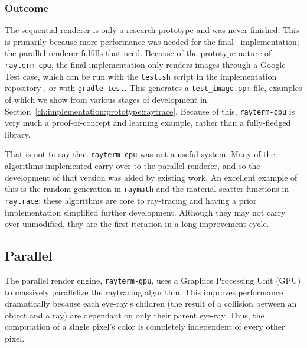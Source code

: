 \subsubsection{Outcome} \label{ch:methods:renderer:sequential:outcome}

The sequential renderer is only a research prototype and was never finished.
This is primarily because more performance was needed for the final \name\ implementation; the parallel renderer fulfills that need.
Because of the prototype nature of \texttt{rayterm-cpu}, the final implementation only renders images through a Google Test \cite{googletest} case, which can be run with the \texttt{test.sh} script in the implementation repository \cite{raytermCpuImpl}, or with \texttt{gradle test}.
This generates a \texttt{test\_image.ppm} file, examples of which we show from various stages of development in Section~\ref{ch:implementation:prototype:raytrace}.
Because of this, \texttt{rayterm-cpu} is very much a proof-of-concept and learning example, rather than a fully-fledged library.

That is not to say that \texttt{rayterm-cpu} was not a useful system.
Many of the algorithms implemented carry over to the parallel renderer, and so the development of that version was aided by existing work.
An excellent example of this is the random generation in \texttt{raymath} and the material scatter functions in \texttt{raytrace}; these algorithms are core to ray-tracing and having a prior implementation simplified further development.
Although they may not carry over unmodified, they are the first iteration in a long improvement cycle.

\subsection{Parallel} \label{ch:methods:renderer:parallel}

The parallel render engine, \texttt{rayterm-gpu}, uses a Graphics Processing Unit (GPU) to massively parallelize the raytracing algorithm.
This improves performance dramatically because each eye-ray's children (the result of a collision between an object and a ray) are dependant on only their parent eye-ray.
Thus, the computation of a single pixel's color is completely independent of every other pixel.

